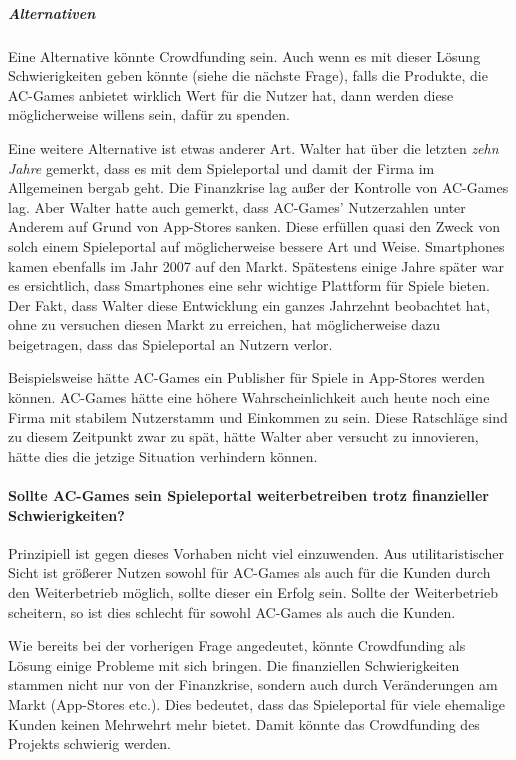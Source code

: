 \subparagraph*{Alternativen}

Eine Alternative könnte Crowdfunding sein. 
Auch wenn es mit dieser Lösung Schwierigkeiten geben könnte (siehe die nächste Frage),
falls die Produkte, die AC-Games anbietet wirklich Wert für die Nutzer hat, dann werden diese möglicherweise willens sein, dafür zu spenden.

Eine weitere Alternative ist etwas anderer Art.
Walter hat über die letzten \emph{zehn Jahre} gemerkt, dass es mit dem Spieleportal und damit der Firma im Allgemeinen bergab geht.
Die Finanzkrise lag außer der Kontrolle von AC-Games lag. Aber Walter hatte auch gemerkt, 
dass AC-Games' Nutzerzahlen unter Anderem auf Grund von App-Stores sanken. 
Diese erfüllen quasi den Zweck von solch einem Spieleportal auf möglicherweise bessere Art und Weise.
Smartphones kamen ebenfalls im Jahr 2007 auf den Markt.
Spätestens einige Jahre später war es ersichtlich, dass Smartphones eine sehr wichtige Plattform für Spiele bieten.
Der Fakt, dass Walter diese Entwicklung ein ganzes Jahrzehnt beobachtet hat, ohne zu versuchen diesen Markt zu erreichen, 
hat möglicherweise dazu beigetragen, dass das Spieleportal an Nutzern verlor.

Beispielsweise hätte AC-Games ein Publisher für Spiele in App-Stores werden können.
AC-Games hätte eine höhere Wahrscheinlichkeit auch heute noch eine Firma mit stabilem Nutzerstamm und Einkommen zu sein.
Diese Ratschläge sind zu diesem Zeitpunkt zwar zu spät, hätte Walter aber versucht zu innovieren, hätte dies die jetzige Situation verhindern können.

\paragraph*{Sollte AC-Games sein Spieleportal weiterbetreiben trotz finanzieller Schwierigkeiten?\cite{kees_faites_2017}}

Prinzipiell ist gegen dieses Vorhaben nicht viel einzuwenden.
Aus utilitaristischer Sicht ist größerer Nutzen sowohl für AC-Games als auch für die Kunden durch den Weiterbetrieb möglich, sollte dieser ein Erfolg sein.
Sollte der Weiterbetrieb scheitern, so ist dies schlecht für sowohl AC-Games als auch die Kunden.

Wie bereits bei der vorherigen Frage angedeutet, könnte Crowdfunding als Lösung einige Probleme mit sich bringen.
Die finanziellen Schwierigkeiten stammen nicht nur von der Finanzkrise, sondern auch durch Veränderungen am Markt (App-Stores etc.).
Dies bedeutet, dass das Spieleportal für viele ehemalige Kunden keinen Mehrwehrt mehr bietet.
Damit könnte das Crowdfunding des Projekts schwierig werden. 

